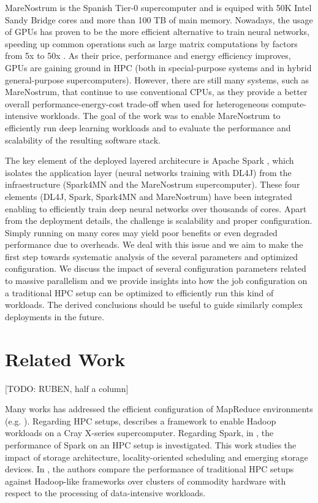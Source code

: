 \documentclass[journal]{IEEEtran}
\begin{document}
MareNostrum is the Spanish Tier-0 supercomputer and is equiped with 50K Intel Sandy Bridge cores and more than 100 TB of main memory. Nowadays, the usage of GPUs has proven to be the more efficient alternative to train neural networks, speeding up common operations such as large matrix computations by factors from 5x to 50x \cite{DBLP:conf/isca/LeeKCDKNSSCHSD10, conf/ipps/Fujimoto08}. As their price, performance and energy efficiency improves, GPUs are gaining ground in HPC (both in special-purpose systems and in hybrid general-purpose supercomputers). However, there are still many systems, such as MareNostrum, that continue to use conventional CPUs, as they provide a better overall performance-energy-cost trade-off when used for heterogeneous compute-intensive workloads. The goal of the work was to enable MareNostrum to efficiently run deep learning workloads and to evaluate the performance and scalability of the resulting software stack. 

The key element of the deployed layered architecure is Apache Spark \cite{spark}, which isolates the application layer (neural networks training with DL4J) from the infraestructure (Spark4MN and the MareNostrum supercomputer). These four elements (DL4J, Spark, Spark4MN and MareNostrum) have been integrated enabling to efficiently train deep neural networks over thousands of cores. Apart from the deployment details, the challenge is scalability and proper configuration. Simply running on many cores may yield poor benefits or even degraded performance due to overheads. We deal with this issue and we aim to make the first step towards systematic analysis of the several parameters and optimized configuration. We discuss the impact of several configuration parameters related to massive parallelism and we provide insights into how the job configuration on a traditional HPC setup can be optimized to efficiently run this kind of workloads. The derived conclusions should be useful to guide similarly complex deployments in the future.



\section{Related Work}
\label{sec:rw}

[TODO: RUBEN, half a column]

Many works has addressed the efficient configuration of MapReduce environments (e.g. \cite{HDB, HBY13}). Regarding HPC setups, \cite{michael2014} describes a framework to enable Hadoop workloads on a Cray X-series supercomputer. Regarding Spark, in \cite{wang2014}, the performance of Spark on an HPC setup is investigated. This work studies the impact of storage architecture, locality-oriented scheduling and emerging storage devices. In \cite{jha2014}, the authors compare the performance of traditional HPC setups against Hadoop-like frameworks over clusters of commodity hardware with respect to the processing of data-intensive workloads. 
\end{document}
